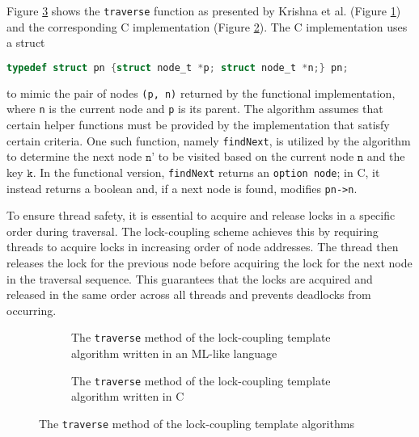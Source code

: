 \documentclass[a4paper,UKenglish,cleveref, autoref, thm-restate]{lipics-v2021}
\begin{document}
Figure \ref{traverse_lock} shows the \lstinline{traverse} function as presented by Krishna et al. (Figure \ref{traverse_lock_a}) and the corresponding C implementation (Figure \ref{traverse_lock_b}). The C implementation uses a struct
\begin{lstlisting}[language = C, backgroundcolor=\color{white}, basicstyle=\ttfamily\footnotesize]
typedef struct pn {struct node_t *p; struct node_t *n;} pn;
\end{lstlisting}
to mimic the pair of nodes \lstinline{(p, n)} returned by the functional implementation, where \lstinline{n} is the current node and \lstinline{p} is its parent. The algorithm assumes that certain helper functions must be provided by the implementation that satisfy certain criteria. One such function, namely \lstinline{findNext}, is utilized by the algorithm to determine the next node $\texttt{n'}$ to be visited based on the current node $\texttt{n}$ and the key $\texttt{k}$. In the functional version, \lstinline{findNext} returns an \lstinline{option node}; in C, it instead returns a boolean and, if a next node is found, modifies \lstinline{pn->n}.

To ensure thread safety, it is essential to acquire and release locks in a specific order during traversal. The lock-coupling scheme achieves this by requiring threads to acquire locks in increasing order of node addresses. The thread then releases the lock for the previous node before acquiring the lock for the next node in the traversal sequence. This guarantees that the locks are acquired and released in the same order across all threads and prevents deadlocks from occurring.

\begin{figure}[ht]
	\begin{subfigure}[t]{0.45\textwidth}
		 
		\caption{The \lstinline{traverse} method of the lock-coupling template algorithm written in an ML-like language \cite{krishna2019compositional}} 
		\label{traverse_lock_a}	
	\end{subfigure}\qquad
	\begin{subfigure}[t]{0.48\textwidth}
		 
		\caption{The \lstinline{traverse} method of the lock-coupling template algorithm written in C}
		\label{traverse_lock_b}
	\end{subfigure}
	\caption{The \lstinline{traverse} method of the lock-coupling template algorithms}
	\label{traverse_lock}
\end{figure}
\end{document}
